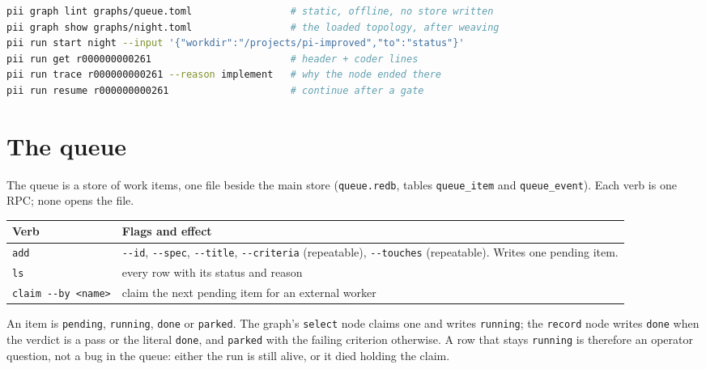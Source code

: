 \begin{lstlisting}[language=bash]
pii graph lint graphs/queue.toml                 # static, offline, no store written
pii graph show graphs/night.toml                 # the loaded topology, after weaving
pii run start night --input '{"workdir":"/projects/pi-improved","to":"status"}'
pii run get r000000000261                        # header + coder lines
pii run trace r000000000261 --reason implement   # why the node ended there
pii run resume r000000000261                     # continue after a gate
\end{lstlisting}

\section{The queue}

The queue is a store of work items, one file beside the main store
(\texttt{queue.redb}, tables \texttt{queue\_item} and \texttt{queue\_event}). Each verb is one
RPC; none opens the file.

\begin{center}
\begin{tabular}{@{}>{\raggedright\arraybackslash}p{}>{\raggedright\arraybackslash}p{}@{}}
  \toprule
  \textbf{Verb} & \textbf{Flags and effect} \\
  \midrule
  \texttt{add} & \texttt{-{}-id}, \texttt{-{}-spec}, \texttt{-{}-title}, \texttt{-{}-criteria}
    (repeatable), \texttt{-{}-touches} (repeatable). Writes one pending item. \\
  \texttt{ls} & every row with its status and reason \\
  \texttt{claim -{}-by <name>} & claim the next pending item for an external worker \\
  \bottomrule
\end{tabular}
\end{center}

An item is \texttt{pending}, \texttt{running}, \texttt{done} or \texttt{parked}. The graph's
\texttt{select} node claims one and writes \texttt{running}; the \texttt{record} node writes
\texttt{done} when the verdict is a pass or the literal \texttt{done}, and \texttt{parked}
with the failing criterion otherwise. A row that stays \texttt{running} is therefore an
operator question, not a bug in the queue: either the run is still alive, or it died holding
the claim.

